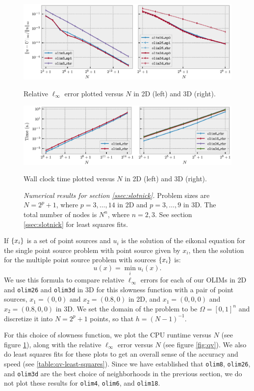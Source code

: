 \documentclass[smallcondensed]{svjour3}
\begin{document}
\begin{figure}
  \centering
  \includegraphics[width=\linewidth]{qv_plots.eps}%
  \caption{Relative $\ell_\infty$ error plotted versus $N$ in 2D
    (left) and 3D (right).}\label{fig:qv}
  \includegraphics[width=\linewidth]{qv-time-plots.eps}%
  \caption{Wall clock time plotted versus $N$ in 2D (left) and 3D
    (right).}\label{fig:qv-time-plots}
  \caption*{\emph{Numerical results for section\@
      \ref{ssec:slotnick}.} Problem sizes are $N = 2^p + 1$, where
    $p = 3, \hdots, 14$ in 2D and $p = 3, \hdots, 9$ in 3D. The total
    number of nodes is $N^n$, where $n = 2, 3$. See section\@
    \ref{ssec:slotnick} for least squares fits.}
\end{figure}

If $\left\{x_i\right\}$ is a set of point sources and $u_i$ is the solution of
the eikonal equation for the single point source problem with point
source given by $x_i$, then the solution for the multiple point source
problem with sources $\left\{x_i\right\}$ is:
\begin{equation}
  u(x) = \min_i u_i(x).
\end{equation}
We use this formula to compare relative $\ell_\infty$ errors for each
of our OLIMs in 2D and \texttt{olim26} and \texttt{olim3d} in 3D for
this slowness function with a pair of point sources, $x_1 = (0, 0)$
and $x_2 = (0.8, 0)$ in 2D, and $x_1 = (0, 0, 0)$ and
$x_2 = (0.8, 0, 0)$ in 3D. We set the domain of the problem to be
$\Omega = [0, 1]^n$ and discretize it into $N = 2^p + 1$ points, so
that $h = (N-1)^{-1}$.

For this choice of slowness function, we plot the CPU runtime versus
$N$ (see figure \ref{fig:qv-time-plots}), along with the relative
$\ell_\infty$ error versus $N$ (see figure \ref{fig:qv}). We also do
least squares fits for these plots to get an overall sense of the
accuracy and speed (see \ref{table:qv-least-squares}). Since we have
established that \texttt{olim8}, \texttt{olim26}, and \texttt{olim3d}
are the best choice of neighborhoods in the previous section, we do
not plot these results for \texttt{olim4}, \texttt{olim6}, and
\texttt{olim18}.
\end{document}
